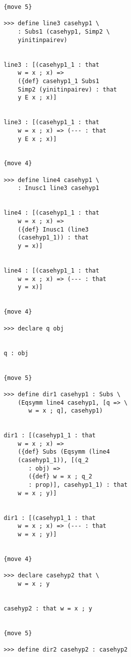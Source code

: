 \documentclass[12pt]{article}
\begin{document}
\begin{verbatim}
               {move 5}

               >>> define line3 casehyp1 \
                   : Subs1 (casehyp1, Simp2 \
                   yinitinpairev)


               line3 : [(casehyp1_1 : that 
                   w = x ; x) => 
                   ({def} casehyp1_1 Subs1 
                   Simp2 (yinitinpairev) : that 
                   y E x ; x)]


               line3 : [(casehyp1_1 : that 
                   w = x ; x) => (--- : that 
                   y E x ; x)]


               {move 4}

               >>> define line4 casehyp1 \
                   : Inusc1 line3 casehyp1


               line4 : [(casehyp1_1 : that 
                   w = x ; x) => 
                   ({def} Inusc1 (line3 
                   (casehyp1_1)) : that 
                   y = x)]


               line4 : [(casehyp1_1 : that 
                   w = x ; x) => (--- : that 
                   y = x)]


               {move 4}

               >>> declare q obj


               q : obj


               {move 5}

               >>> define dir1 casehyp1 : Subs \
                   (Eqsymm line4 casehyp1, [q => \
                      w = x ; q], casehyp1)


               dir1 : [(casehyp1_1 : that 
                   w = x ; x) => 
                   ({def} Subs (Eqsymm (line4 
                   (casehyp1_1)), [(q_2 
                      : obj) => 
                      ({def} w = x ; q_2 
                      : prop)], casehyp1_1) : that 
                   w = x ; y)]


               dir1 : [(casehyp1_1 : that 
                   w = x ; x) => (--- : that 
                   w = x ; y)]


               {move 4}

               >>> declare casehyp2 that \
                   w = x ; y


               casehyp2 : that w = x ; y


               {move 5}

               >>> define dir2 casehyp2 : casehyp2



\end{verbatim}
\end{document}

